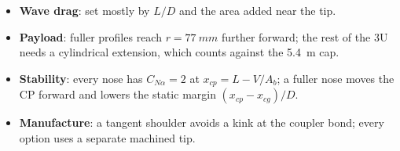 \begin{itemize}[leftmargin=*,itemsep=2pt]
\item \textbf{Wave drag}: set mostly by $L/D$ and the area added near the tip.
\item \textbf{Payload}: fuller profiles reach $r = \SI{77}{mm}$ further forward; the rest of the 3U needs a
cylindrical extension, which counts against the \SI{5.4}{m} cap.
\item \textbf{Stability}: every nose has $C_{N\alpha} = 2$ at $x_{cp} = L - V/A_b$; a fuller nose moves the
CP forward and lowers the static margin $(x_{cp} - x_{cg})/D$.
\item \textbf{Manufacture}: a tangent shoulder avoids a kink at the coupler bond; every option uses a
separate machined tip.
\end{itemize}
